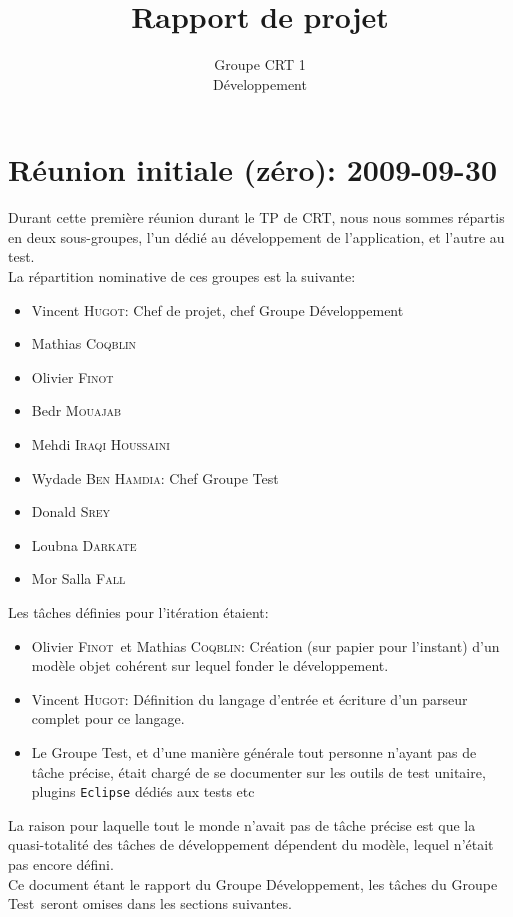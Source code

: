 \documentclass[a4paper,12pt]{article}
\author{Groupe CRT 1\\Développement}
\title{Rapport de projet}
\def\familyname{\textsc}
\def\firstname#1{#1}
\def\groupmember#1#2{\firstname{#1} \familyname{#2}}
\def\mwyd{\groupmember{Wydade}{Ben Hamdia}}
\def\mmat{\groupmember{Mathias}{Coqblin}}
\def\mlou{\groupmember{Loubna}{Darkate}}
\def\mmor{\groupmember{Mor Salla}{Fall}}
\def\moli{\groupmember{Olivier}{Finot}}
\def\mvin{\groupmember{Vincent}{Hugot}}
\def\mmed{\groupmember{Mehdi}{Iraqi Houssaini}}
\def\mbed{\groupmember{Bedr}{Mouajab}}
\def\mdon{\groupmember{Donald}{Srey}}
\def\grpd{Groupe Développement}
\def\grpt{Groupe Test}
\begin{document}
 
\maketitle


\tableofcontents

\newpage
\section{Réunion initiale (zéro): 2009-09-30}

Durant cette première réunion durant le TP de CRT, nous 
nous sommes répartis en deux sous-groupes, l'un dédié au développement
de l'application, et l'autre au test.\mk\\
%
La répartition nominative de ces groupes est la suivante:

\begin{itemize}
\item \mvin : Chef de projet, chef \grpd
\item \mmat
\item \moli
\item \mbed
\item \mmed \mk\\
\end{itemize}


\begin{itemize}
\item \mwyd : Chef \grpt
\item \mdon
\item \mlou
\item \mmor
\end{itemize}


\noi Les tâches définies pour l'itération étaient:

\begin{itemize}
 \item \moli\ et \mmat: Création (sur papier pour l'instant) d'un modèle objet cohérent sur lequel fonder le développement.
\item  \mvin : Définition du langage d'entrée et écriture d'un parseur complet pour ce langage.
\item Le \grpt, et d'une manière générale tout personne n'ayant pas de tâche précise,
était chargé de se documenter sur les outils de test
unitaire, plugins \texttt{Eclipse} dédiés aux tests etc
\end{itemize}
La raison pour laquelle tout le monde n'avait pas de tâche précise est que la 
quasi-totalité des tâches de développement dépendent du modèle, lequel n'était 
pas encore défini.\mk\\
%
Ce document étant le rapport du \grpd, les tâches du \grpt\ seront
omises dans les sections suivantes.
\end{document}
